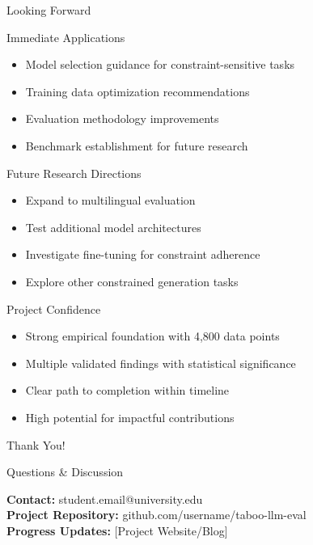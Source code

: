 \documentclass[aspectratio=169]{beamer}
\begin{document}
\begin{frame}{Looking Forward}
\begin{block}{Immediate Applications}
\begin{itemize}
    \item Model selection guidance for constraint-sensitive tasks
    \item Training data optimization recommendations
    \item Evaluation methodology improvements
    \item Benchmark establishment for future research
\end{itemize}
\end{block}

\begin{block}{Future Research Directions}
\begin{itemize}
    \item Expand to multilingual evaluation
    \item Test additional model architectures
    \item Investigate fine-tuning for constraint adherence
    \item Explore other constrained generation tasks
\end{itemize}
\end{block}

\begin{block}{Project Confidence}
\small
\begin{itemize}
    \item Strong empirical foundation with 4,800 data points
    \item Multiple validated findings with statistical significance
    \item Clear path to completion within timeline
    \item High potential for impactful contributions
\end{itemize}
\end{block}
\end{frame}

\begin{frame}[plain]
\begin{center}
\huge Thank You!

\vspace{1cm}

\Large Questions \& Discussion

\vspace{1cm}

\normalsize
\textbf{Contact:} student.email@university.edu\\
\textbf{Project Repository:} github.com/username/taboo-llm-eval\\
\textbf{Progress Updates:} [Project Website/Blog]
\end{center}
\end{frame}
\end{document}
